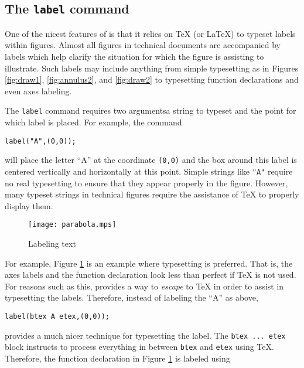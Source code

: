 \subsection{The \texttt{label} command}

One of the nicest features of \MP{} is that it relies on \TeX{} (or
\LaTeX) to typeset labels within figures.  Almost all figures in
technical documents are accompanied by labels which help clarify the
situation for which the figure is assisting to illustrate.  Such labels
may include anything from simple typesetting as in Figures
\ref{fig:draw1}, \ref{fig:annulus2}, and \ref{fig:draw2} to typesetting
function declarations and even axes labeling.

The \texttt{label} command requires two arguments\Dash a string to
typeset and the point for which label is placed.  For example, the
command

\begin{center}
  \verb|label("A",(0,0));|
\end{center}

will place the letter ``A'' at the coordinate \texttt{(0,0)} and the box
around this label is centered vertically and horizontally at this point.
Simple strings like \texttt{"A"} require no real typesetting to ensure
that they appear properly in the figure.  However, many typeset strings
in technical figures require the assistance of \TeX{} to properly
display them.

\begin{figure}
  \centering
  \texttt{[image: parabola.mps]}
  \caption{Labeling text}
  \label{fig:parabola}
\end{figure}

For example, Figure \ref{fig:parabola} is an example where typesetting
is preferred.  That is, the axes labels and the function declaration
look less than perfect if \TeX{} is not used.  For reasons such as this,
\MP{} provides a way to \textit{escape} to \TeX{} in order to assist in
typesetting the labels.  Therefore, instead of labeling the ``A'' as
above,

\begin{center}
  \verb|label(btex A etex,(0,0));|
\end{center}

provides a much nicer technique for typesetting the label.  The
\texttt{btex\,...\,etex} block instructs \MP{} to process everything in
between \texttt{btex} and \texttt{etex} using \TeX.  Therefore, the
function declaration in Figure \ref{fig:parabola} is labeled using

